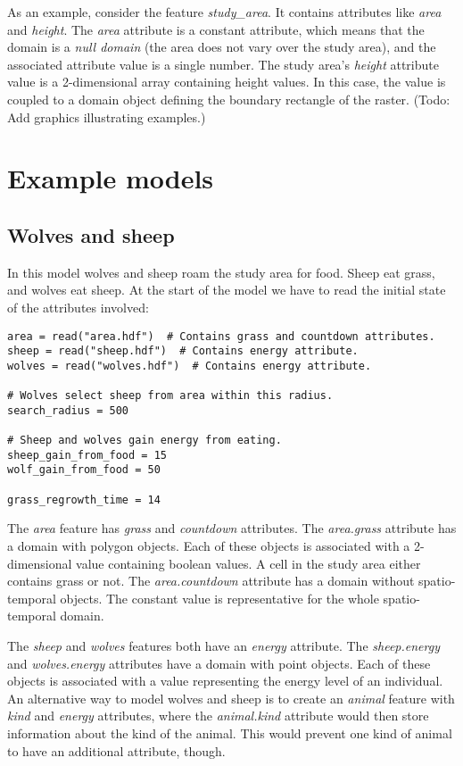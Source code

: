 \documentclass[10pt, a4paper]{article}
\begin{document}
As an example, consider the feature \emph{study\_area}. It contains attributes like \emph{area} and \emph{height}. The \emph{area} attribute is a constant attribute, which means that the domain is a \emph{null domain} (the area does not vary over the study area), and the associated attribute value is a single number. The study area's \emph{height} attribute value is a 2-dimensional array containing height values. In this case, the value is coupled to a domain object defining the boundary rectangle of the raster. (Todo: Add graphics illustrating examples.)

\section{Example models}

\subsection{Wolves and sheep}
In this model wolves and sheep roam the study area for food. Sheep eat grass, and wolves eat sheep. At the start of the model we have to read the initial state of the attributes involved:

\begin{lstlisting}
area = read("area.hdf")  # Contains grass and countdown attributes.
sheep = read("sheep.hdf")  # Contains energy attribute.
wolves = read("wolves.hdf")  # Contains energy attribute.

# Wolves select sheep from area within this radius.
search_radius = 500

# Sheep and wolves gain energy from eating.
sheep_gain_from_food = 15
wolf_gain_from_food = 50

grass_regrowth_time = 14
\end{lstlisting}

The \emph{area} feature has \emph{grass} and \emph{countdown} attributes. The \emph{area.grass} attribute has a domain with polygon objects. Each of these objects is associated with a 2-dimensional value containing boolean values. A cell in the study area either contains grass or not. The \emph{area.countdown} attribute has a domain without spatio-temporal objects. The constant value is representative for the whole spatio-temporal domain.

The \emph{sheep} and \emph{wolves} features both have an \emph{energy} attribute. The \emph{sheep.energy} and \emph{wolves.energy} attributes have a domain with point objects. Each of these objects is associated with a value representing the energy level of an individual. An alternative way to model wolves and sheep is to create an \emph{animal} feature with \emph{kind} and \emph{energy} attributes, where the \emph{animal.kind} attribute would then store information about the kind of the animal. This would prevent one kind of animal to have an additional attribute, though.
\end{document}
